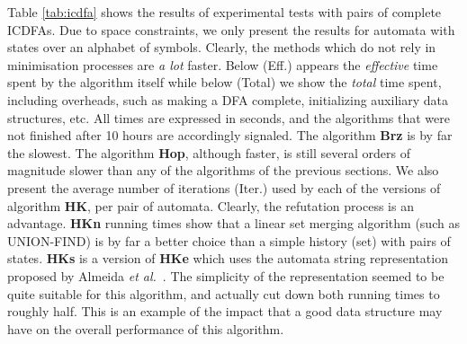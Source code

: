 \documentclass[copyright]{eptcs}
\newcommand{\dfa}{DFA\xspace}
\newcommand{\icdfa}{ICDFA\xspace}
\newcommand{\hop}{\textbf{Hop}\xspace}
\newcommand{\hk}{\textbf{HK}\xspace}
\newcommand{\hkn}{\textbf{HKn}\xspace}
\newcommand{\hke}{\textbf{HKe}\xspace}
\newcommand{\hks}{\textbf{HKs}\xspace}
\newcommand{\brz}{\textbf{Brz}\xspace}
\begin{document}
  Table \ref{tab:icdfa} shows the results of
experimental tests with  pairs of complete \icdfa{}s. Due to
space constraints, we only present the results for automata with  states over an alphabet of 
symbols. Clearly, the methods which do not rely in minimisation
processes are \emph{a lot} faster.  Below (Eff.) appears the
\emph{effective} time spent by the algorithm itself while below
(Total) we show the \emph{total} time spent, including overheads,
such as making a \dfa complete, initializing auxiliary data
structures, etc. All times are expressed in seconds, and the
algorithms that were not finished after 10 hours are accordingly
signaled. The algorithm \brz{} is by far the slowest. The algorithm
\hop, although faster, is still several orders of magnitude slower
than any of the algorithms of the previous sections. We also present
the average number of iterations (Iter.) used by each of the versions
of algorithm \hk, per pair of automata. Clearly, the refutation
process is an advantage. \hkn{} running times show that a linear set
merging algorithm (such as UNION-FIND) is by far a better choice than
a simple history (set) with pairs of states. \hks{} is a version of
\hke{} which uses the automata string representation proposed by Almeida \emph{et al.}~\cite{almeida07_c:_enumer_gener_strin_autom_repres,reis05_c:_repres_finit_dcfs}. The simplicity of
the representation seemed to be quite suitable for this algorithm, and
actually cut down both running times to roughly half. This is an
example of the impact that a good data structure may have on the
overall performance of this algorithm.
\end{document}
